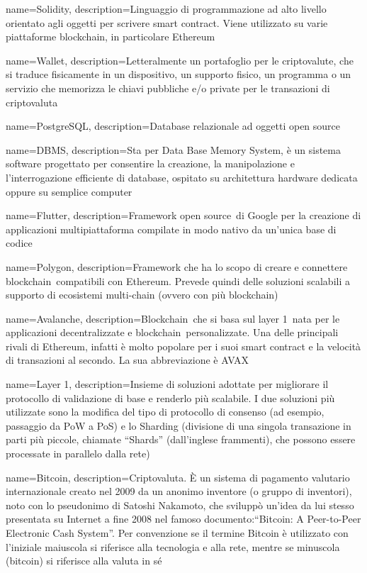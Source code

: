 {
	name={Solidity},
	description={Linguaggio di programmazione ad alto livello orientato agli oggetti per scrivere smart contract. Viene utilizzato su varie piattaforme blockchain\glo , in particolare Ethereum}
}

{
	name={Wallet},
	description={Letteralmente un portafoglio per le criptovalute\glo , che si traduce fisicamente in un dispositivo, un supporto fisico, un programma o un servizio che memorizza le chiavi pubbliche e/o private per le transazioni di criptovaluta\glo}
}	

{
	name={PostgreSQL},
	description={Database relazionale ad oggetti open source\glo}
}

{
	name={DBMS},
	description={Sta per Data Base Memory System, è un sistema software progettato per consentire la creazione, la manipolazione e l'interrogazione efficiente di database, ospitato su architettura hardware dedicata oppure su semplice computer}
}

{
	name={Flutter},
	description={Framework open source\glo\ di Google per la creazione di applicazioni multipiattaforma compilate in modo nativo da un’unica base di codice}
}

{
	name={Polygon},
	description={Framework che ha lo scopo di creare e connettere blockchain\glo\ compatibili con Ethereum. Prevede quindi delle soluzioni scalabili a supporto di ecosistemi multi-chain (ovvero con più blockchain\glo)}
}

{
	name={Avalanche},
	description={Blockchain\glo\ che si basa sul layer 1\glo\ nata per le applicazioni decentralizzate e blockchain\glo\ personalizzate. Una delle principali rivali di Ethereum, infatti è molto popolare per i suoi smart contract e la velocità di transazioni al secondo. La sua abbreviazione è AVAX}
}

{
	name={Layer 1},
	description={Insieme di soluzioni adottate per migliorare il protocollo di validazione di base e renderlo più scalabile. I due soluzioni più utilizzate sono la modifica del tipo di protocollo di consenso (ad esempio, passaggio da PoW a PoS) e lo Sharding (divisione di una singola transazione in parti più piccole, chiamate “Shards” (dall’inglese frammenti), che possono essere processate in parallelo dalla rete)}
}

{
	name={Bitcoin},
	description={Criptovaluta\glo. È un sistema di pagamento valutario internazionale creato nel 2009 da un anonimo inventore (o gruppo di inventori), noto con lo pseudonimo di Satoshi Nakamoto, che sviluppò un'idea da lui stesso presentata su Internet a fine 2008 nel famoso documento:“Bitcoin: A Peer-to-Peer Electronic Cash System”. Per convenzione se il termine Bitcoin è utilizzato con l'iniziale maiuscola si riferisce alla tecnologia e alla rete, mentre se minuscola (bitcoin) si riferisce alla valuta in sé}
}

